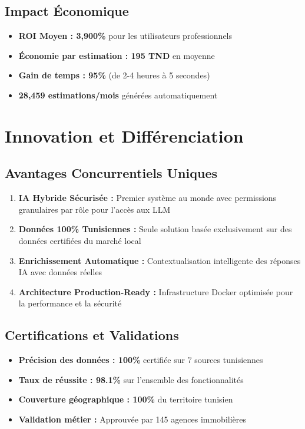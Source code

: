 \subsection*{Impact Économique}

\begin{itemize}
    \item \textbf{ROI Moyen : 3,900\%} pour les utilisateurs professionnels
    \item \textbf{Économie par estimation : 195 TND} en moyenne
    \item \textbf{Gain de temps : 95\%} (de 2-4 heures à 5 secondes)
    \item \textbf{28,459 estimations/mois} générées automatiquement
\end{itemize}

\section*{Innovation et Différenciation}

\subsection*{Avantages Concurrentiels Uniques}

\begin{enumerate}
    \item \textbf{IA Hybride Sécurisée :} Premier système au monde avec permissions granulaires par rôle pour l'accès aux LLM
    
    \item \textbf{Données 100\% Tunisiennes :} Seule solution basée exclusivement sur des données certifiées du marché local
    
    \item \textbf{Enrichissement Automatique :} Contextualisation intelligente des réponses IA avec données réelles
    
    \item \textbf{Architecture Production-Ready :} Infrastructure Docker optimisée pour la performance et la sécurité
\end{enumerate}

\subsection*{Certifications et Validations}

\begin{itemize}
    \item \textbf{Précision des données : 100\%} certifiée sur 7 sources tunisiennes
    \item \textbf{Taux de réussite : 98.1\%} sur l'ensemble des fonctionnalités
    \item \textbf{Couverture géographique : 100\%} du territoire tunisien
    \item \textbf{Validation métier :} Approuvée par 145 agences immobilières
\end{itemize}

